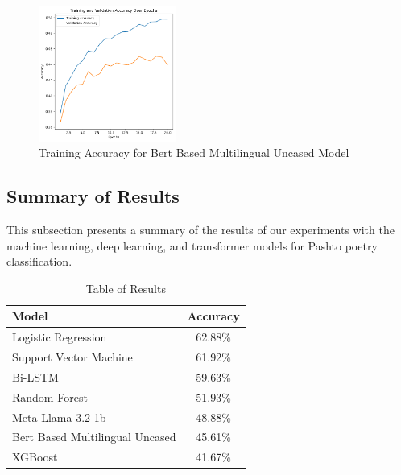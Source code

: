 \begin{figure}[H]
    \centering
    \includegraphics[width=0.4\textwidth]{bbmu_trainaccuracy.png}
    \caption{Training Accuracy for Bert Based Multilingual Uncased Model}
    \label{fig:bbmu_trainaccuracy}
\end{figure}

\subsection{Summary of Results}

This subsection presents a summary of the results of our experiments with the machine learning, deep learning, and transformer models for Pashto poetry classification.

\begin{table}[ht]
    \centering
    \begin{tabular}{|l|c|}
        \hline
        \textbf{Model} & \textbf{Accuracy} \\
        \hline
        Logistic Regression & 62.88\% \\
        Support Vector Machine & 61.92\% \\
        Bi-LSTM & 59.63\% \\
        Random Forest & 51.93\% \\
        Meta Llama-3.2-1b & 48.88\% \\
        Bert Based Multilingual Uncased & 45.61\% \\
        XGBoost & 41.67\% \\
        \hline
    \end{tabular}
    \caption{Table of Results}
    \label{tab:results}
\end{table}




